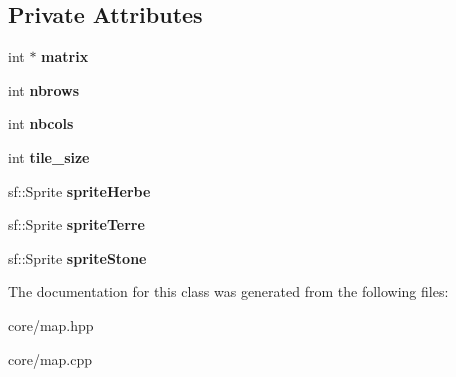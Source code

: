 \subsection*{\-Private \-Attributes}
\begin{DoxyCompactItemize}
\item 
\hypertarget{classMap_a4c29b9198025062730c467e266a8c218_a4c29b9198025062730c467e266a8c218}{int $\ast$ {\bfseries matrix}}\label{classMap_a4c29b9198025062730c467e266a8c218_a4c29b9198025062730c467e266a8c218}

\item 
\hypertarget{classMap_ac4ac0094dcb7bf690f5926398598da2b_ac4ac0094dcb7bf690f5926398598da2b}{int {\bfseries nbrows}}\label{classMap_ac4ac0094dcb7bf690f5926398598da2b_ac4ac0094dcb7bf690f5926398598da2b}

\item 
\hypertarget{classMap_a559091d12056d5b69ac8b6fd34daf25b_a559091d12056d5b69ac8b6fd34daf25b}{int {\bfseries nbcols}}\label{classMap_a559091d12056d5b69ac8b6fd34daf25b_a559091d12056d5b69ac8b6fd34daf25b}

\item 
\hypertarget{classMap_aa8f01ed967a3229ea3f4e88c70f72cf5_aa8f01ed967a3229ea3f4e88c70f72cf5}{int {\bfseries tile\-\_\-size}}\label{classMap_aa8f01ed967a3229ea3f4e88c70f72cf5_aa8f01ed967a3229ea3f4e88c70f72cf5}

\item 
\hypertarget{classMap_a7f224151b91dc91347c94940d184e796_a7f224151b91dc91347c94940d184e796}{sf\-::\-Sprite {\bfseries sprite\-Herbe}}\label{classMap_a7f224151b91dc91347c94940d184e796_a7f224151b91dc91347c94940d184e796}

\item 
\hypertarget{classMap_a37b10dab448586f3e63ccb40423e4592_a37b10dab448586f3e63ccb40423e4592}{sf\-::\-Sprite {\bfseries sprite\-Terre}}\label{classMap_a37b10dab448586f3e63ccb40423e4592_a37b10dab448586f3e63ccb40423e4592}

\item 
\hypertarget{classMap_a752dda66c66d35cb47f135cfd7ac1518_a752dda66c66d35cb47f135cfd7ac1518}{sf\-::\-Sprite {\bfseries sprite\-Stone}}\label{classMap_a752dda66c66d35cb47f135cfd7ac1518_a752dda66c66d35cb47f135cfd7ac1518}

\end{DoxyCompactItemize}


\-The documentation for this class was generated from the following files\-:\begin{DoxyCompactItemize}
\item 
core/map.\-hpp\item 
core/map.\-cpp\end{DoxyCompactItemize}
